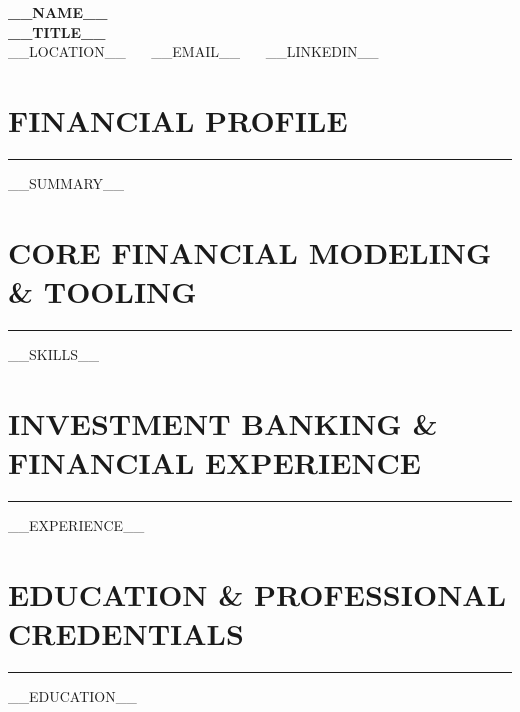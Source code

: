 \documentclass[10pt,letterpaper]{article}
\begin{document}
\begin{center}
    {\LARGE \textbf{\color{darkgray} __NAME__}} \\ \vspace{2pt}
    {\large \textbf{__TITLE__}} \\ \vspace{2pt}
    \small __LOCATION__ \ \textbar\ \ __EMAIL__ \ \textbar\ \ __LINKEDIN__
\end{center}

\vspace{-4pt}
\section*{\large\bfseries\color{primary}\uppercase{Financial Profile}}
\vspace{-4pt}\rule{\textwidth}{0.8pt}\vspace{3pt}
__SUMMARY__

\section*{\large\bfseries\color{primary}\uppercase{Core Financial Modeling \& Tooling}}
\vspace{-4pt}\rule{\textwidth}{0.8pt}\vspace{3pt}
\small
__SKILLS__

\section*{\large\bfseries\color{primary}\uppercase{Investment Banking \& Financial Experience}}
\vspace{-4pt}\rule{\textwidth}{0.8pt}\vspace{3pt}
\small
__EXPERIENCE__

\section*{\large\bfseries\color{primary}\uppercase{Education \& Professional Credentials}}
\vspace{-4pt}\rule{\textwidth}{0.8pt}\vspace{3pt}
\small
__EDUCATION__
\end{document}
